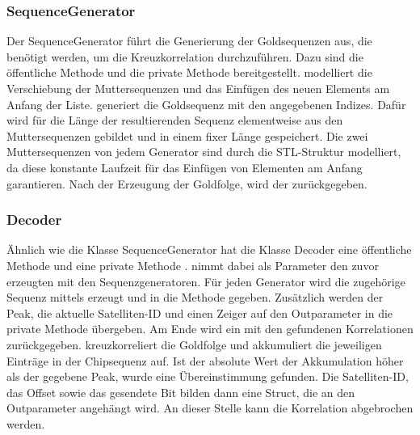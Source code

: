 \subsubsection*{SequenceGenerator}
Der SequenceGenerator führt die Generierung der Goldsequenzen aus, die benötigt werden, um die Kreuzkorrelation durchzuführen. Dazu sind die öffentliche Methode  und die private Methode  bereitgestellt.  modelliert die Verschiebung der Muttersequenzen und das Einfügen des neuen Elements am Anfang der Liste. 
 generiert die Goldsequenz mit den angegebenen Indizes. Dafür wird für die Länge der resultierenden Sequenz elementweise aus den Muttersequenzen gebildet und in einem  fixer Länge gespeichert. Die zwei Muttersequenzen von jedem Generator sind durch die STL-Struktur  modelliert, da diese konstante Laufzeit für das Einfügen von Elementen am Anfang garantieren. Nach der Erzeugung der Goldfolge, wird der  zurückgegeben.

\subsubsection*{Decoder}
Ähnlich wie die Klasse SequenceGenerator hat die Klasse Decoder eine öffentliche Methode  und eine private Methode .  nimmt dabei als Parameter den zuvor erzeugten  mit den Sequenzgeneratoren. Für jeden Generator wird die zugehörige Sequenz mittels  erzeugt und in die Methode  gegeben. Zusätzlich werden der Peak, die aktuelle Satelliten-ID und einen Zeiger auf den Outparameter in die private Methode übergeben. Am Ende wird ein  mit den gefundenen Korrelationen zurückgegeben.
 kreuzkorreliert die Goldfolge und akkumuliert die jeweiligen Einträge in der Chipsequenz auf. Ist der absolute Wert der Akkumulation höher als der gegebene Peak, wurde eine Übereinstimmung gefunden. Die Satelliten-ID, das Offset sowie das gesendete Bit bilden dann eine Struct, die an den Outparameter angehängt wird. An dieser Stelle kann die Korrelation abgebrochen werden.

